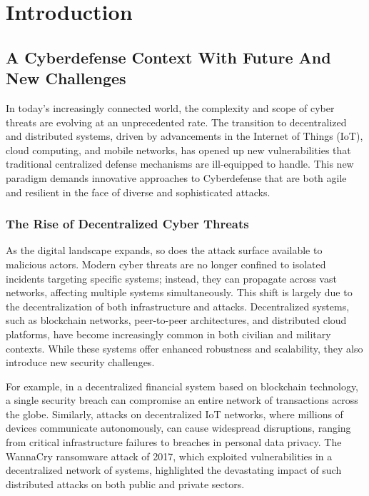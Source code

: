 \chapter{Introduction}\label{ch:introduction}

\section{A Cyberdefense Context With Future And New Challenges}

In today's increasingly connected world, the complexity and scope of cyber threats are evolving at an unprecedented rate. The transition to decentralized and distributed systems, driven by advancements in the Internet of Things (IoT), cloud computing, and mobile networks, has opened up new vulnerabilities that traditional centralized defense mechanisms are ill-equipped to handle\cite{sun2014data}. This new paradigm demands innovative approaches to Cyberdefense that are both agile and resilient in the face of diverse and sophisticated attacks\cite{taddeo2019trusting}.

\subsection{The Rise of Decentralized Cyber Threats}

As the digital landscape expands, so does the attack surface available to malicious actors. Modern cyber threats are no longer confined to isolated incidents targeting specific systems; instead, they can propagate across vast networks, affecting multiple systems simultaneously. This shift is largely due to the decentralization of both infrastructure and attacks\cite{li2020survey}. Decentralized systems, such as blockchain networks, peer-to-peer architectures, and distributed cloud platforms, have become increasingly common in both civilian and military contexts. While these systems offer enhanced robustness and scalability, they also introduce new security challenges\cite{sun2014data}.

For example, in a decentralized financial system based on blockchain technology, a single security breach can compromise an entire network of transactions across the globe\cite{li2020survey}. Similarly, attacks on decentralized IoT networks, where millions of devices communicate autonomously, can cause widespread disruptions, ranging from critical infrastructure failures to breaches in personal data privacy\cite{sun2014data}. The WannaCry ransomware attack of 2017, which exploited vulnerabilities in a decentralized network of systems, highlighted the devastating impact of such distributed attacks on both public and private sectors\cite{mohurle2017wannacry}.

